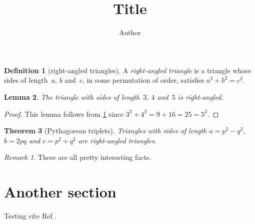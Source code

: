 \newtheorem{theorem}{Theorem}
\newtheorem{corollary}[theorem]{Corollary}
\newtheorem{lemma}[theorem]{Lemma}
\theoremstyle{definition}
\newtheorem{definition}[theorem]{Definition}
\theoremstyle{remark}
\newtheorem{remark}{Remark}

\title{Title}
\author{Author}

\begin{definition}[right-angled triangles] \label{def:tri}
A \emph{right-angled triangle} is a triangle whose sides of length~\(a\), \(b\) and~\(c\), in some permutation of order, satisfies \(a^2+b^2=c^2\).
\end{definition}

\begin{lemma}
The triangle with sides of length~\(3\), \(4\) and~\(5\) is right-angled.
\end{lemma}

\begin{proof}
This lemma follows from \cref{def:tri} since \(3^2+4^2=9+16=25=5^2\).
\end{proof}

\begin{theorem}[Pythagorean triplets] \label{thm:py}
Triangles with sides of length \(a=p^2-q^2\), \(b=2pq\) and \(c=p^2+q^2\) are right-angled triangles.
\end{theorem}

\begin{remark}
These are all pretty interesting facts.
\end{remark}

\section{Another section}
Testing cite Ref \cite{temp}.



